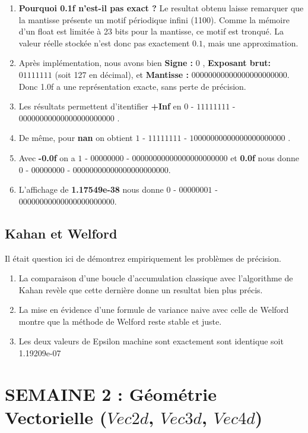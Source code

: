 \documentclass[12pt,a4paper]{report}
\begin{document}
\begin{enumerate}
    \item \textbf{Pourquoi 0.1f n'est-il pas exact ? } Le resultat obtenu laisse remarquer que la mantisse présente un motif périodique infini (1100). Comme la mémoire d'un float est limitée à 23 bits pour la mantisse, ce motif est tronqué. La valeur réelle stockée n'est donc pas exactement $0.1$, mais une approximation.
    \item Après implémentation, nous avons bien \textbf{Signe :} $0$ , \textbf{Exposant brut: } $01111111$ (soit 127 en décimal), et \textbf{Mantisse :} $00000000000000000000000$. Donc 1.0f a une représentation exacte, sans perte de précision.
    \item Les résultats permettent d'itentifier \textbf{+Inf} en $0$ - $11111111$ - $00000000000000000000000$ .
    \item De même, pour \textbf{nan} on obtient $1$ - $11111111$ - $10000000000000000000000$ .
    \item Avec \textbf{-0.0f} on a $1$ - $00000000$ - $00000000000000000000000$ et \textbf{0.0f} nous donne $0$ - $00000000$ - $00000000000000000000000$.
    \item L'affichage de \textbf{1.17549e-38} nous donne $0$ - $00000001$ - $00000000000000000000000$.
\end{enumerate}

\section{Kahan et Welford}

Il était question ici de démontrez empiriquement les problèmes de précision.

\begin{enumerate}
    \item La comparaison d'une boucle d'accumulation classique avec l'algorithme de Kahan revèle que cette dernière donne un resultat bien plus précis.
    \item La mise en évidence d'une formule de variance naive avec celle de Welford montre que la méthode de Welford reste stable et juste.
    \item Les deux valeurs de Epsilon machine sont exactement sont identique soit 1.19209e-07 
\end{enumerate}



\chapter{SEMAINE 2 : Géométrie Vectorielle ($Vec2d$, $Vec3d$, $Vec4d$)}
\end{document}
